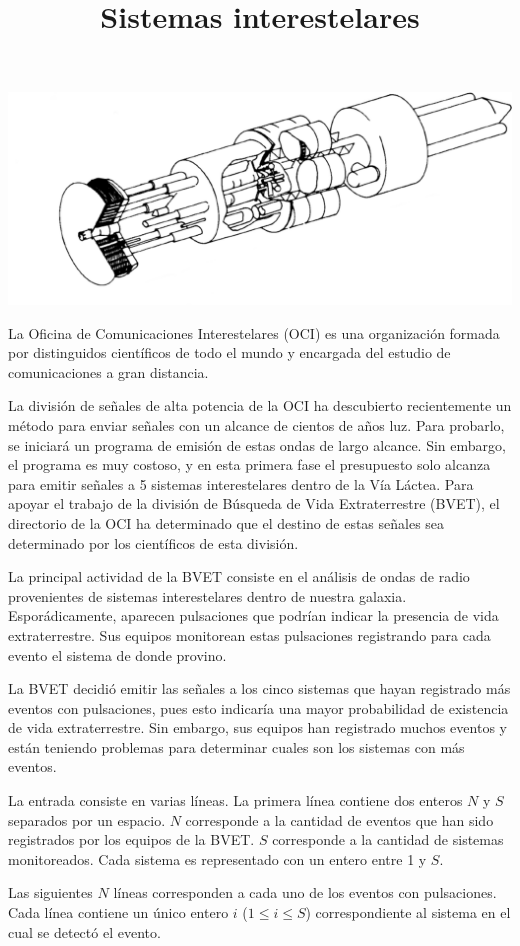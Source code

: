 \documentclass{oci}
\title{Sistemas interestelares}
\begin{document}
\begin{problemDescription}
\begin{center}
\includegraphics[scale=0.3]{interestellar.png}
\end{center}
La Oficina de Comunicaciones Interestelares (OCI) es una organización formada por distinguidos científicos de todo el mundo y encargada del estudio de comunicaciones a gran distancia.

La división de señales de alta potencia de la OCI ha descubierto recientemente un método para enviar señales con un alcance de cientos de años luz.
Para probarlo, se iniciará un programa de emisión de estas ondas de largo alcance.
Sin embargo, el programa es muy costoso, y en esta primera fase el presupuesto solo alcanza para emitir señales a 5 sistemas interestelares dentro de la Vía Láctea.
Para apoyar el trabajo de la división de Búsqueda de Vida Extraterrestre (BVET), el directorio de la OCI ha determinado que el destino de estas señales sea determinado por los científicos de esta división.

La principal actividad de la BVET consiste en el análisis de ondas de radio provenientes de sistemas interestelares dentro de nuestra galaxia.
Esporádicamente, aparecen pulsaciones que podrían indicar la presencia de vida extraterrestre.
Sus equipos monitorean estas pulsaciones registrando para cada evento el sistema de donde provino.

La BVET decidió emitir las señales a los cinco sistemas que hayan registrado más eventos con pulsaciones, pues esto indicaría una mayor probabilidad de existencia de vida extraterrestre.
Sin embargo, sus equipos han registrado muchos eventos y están teniendo problemas para determinar cuales son los sistemas con más eventos.

\end{problemDescription}

\begin{inputDescription}
La entrada consiste en varias líneas.
La primera línea contiene dos enteros $N$ y $S$ separados por un espacio.
$N$ corresponde a la cantidad de eventos que han sido registrados por los equipos de la BVET.
$S$ corresponde a la cantidad de sistemas monitoreados.
Cada sistema es representado con un entero entre 1 y $S$.

Las siguientes $N$ líneas corresponden a cada uno de los eventos con pulsaciones.
Cada línea contiene un único entero $i$ ($1 \le i \le S$) correspondiente al sistema en el cual se detectó el evento.
\end{inputDescription}
\end{document}
